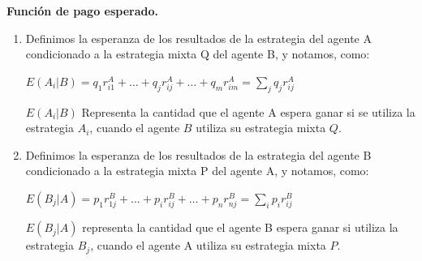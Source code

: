 \begin{definicion}
\textbf{Función de pago esperado.}\\
\begin{enumerate}
    \item Definimos la esperanza de los resultados de la estrategia  del agente A condicionado a la estrategia mixta Q del agente B, y notamos,  como:
    \begin{center}
        $E(A_i|B) = q_1r_{i1}^A+\ldots+q_jr_{ij}^A+\ldots+q_mr_{im}^A = \underset{j}{\sum}q_jr_{ij}^A$
    \end{center}
    $E(A_i|B)$ Representa la cantidad que el agente A espera ganar si se utiliza la estrategia $A_i$, cuando el agente $B$ utiliza su estrategia mixta $Q$.

    \item Definimos la esperanza de los resultados de la estrategia  del agente B condicionado a la estrategia mixta P del agente A, y notamos,  como:
    \begin{center}
        $E(B_j|A) = p_1r_{1j}^B+\ldots+p_ir_{ij}^B+\ldots+p_nr_{nj}^B = \underset{i}{\sum}p_ir_{ij}^B$
    \end{center}
     $E(B_j|A)$ representa la cantidad que el agente B espera ganar si utiliza la estrategia $B_j$, cuando el agente A utiliza su estrategia mixta $P$.
\end{enumerate}
\end{definicion}

